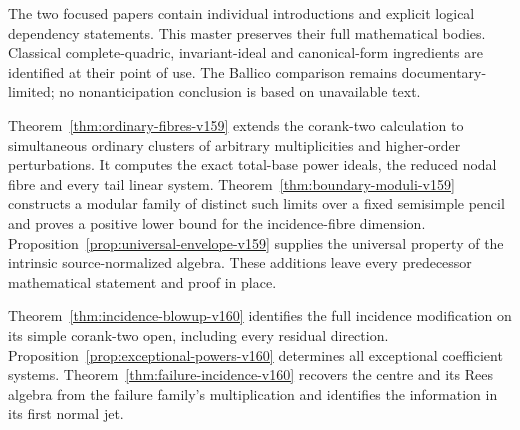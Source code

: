 The two focused papers contain individual introductions and explicit
logical dependency statements. This master preserves their full
mathematical bodies. Classical complete-quadric, invariant-ideal and
canonical-form ingredients are identified at their point of use.
The Ballico comparison \cite{Ballico93} remains documentary-limited;
no nonanticipation conclusion is based on unavailable text.

Theorem~\ref{thm:ordinary-fibres-v159} extends the corank-two calculation
to simultaneous ordinary clusters of arbitrary multiplicities and
higher-order perturbations. It computes the exact total-base power
ideals, the reduced nodal fibre and every tail linear system.
Theorem~\ref{thm:boundary-moduli-v159} constructs a modular family of
distinct such limits over a fixed semisimple pencil and proves a
positive lower bound for the incidence-fibre dimension.
Proposition~\ref{prop:universal-envelope-v159} supplies the universal
property of the intrinsic source-normalized algebra. These additions
leave every predecessor mathematical statement and proof in place.

Theorem~\ref{thm:incidence-blowup-v160} identifies the full incidence
modification on its simple corank-two open, including every residual
direction. Proposition~\ref{prop:exceptional-powers-v160} determines
all exceptional coefficient systems. Theorem~\ref{thm:failure-incidence-v160}
recovers the centre and its Rees algebra from the failure family's
multiplication and identifies the information in its first normal jet.

